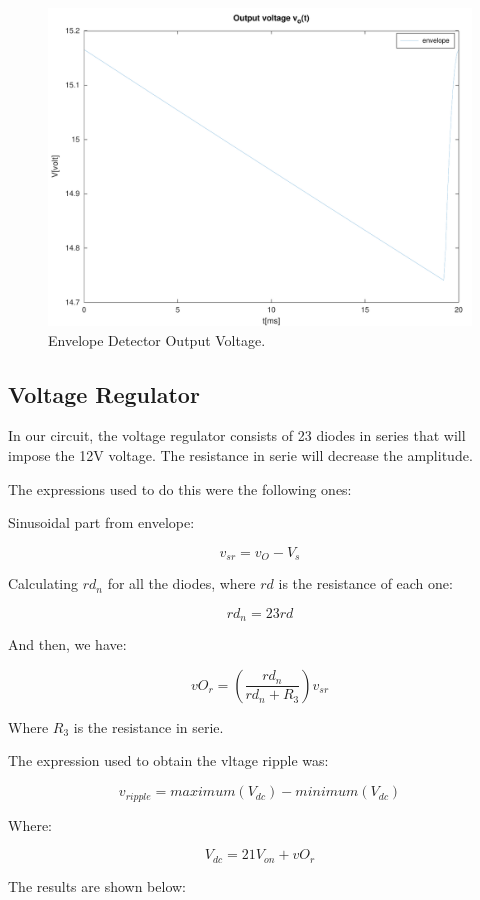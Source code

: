 \begin{figure}[H] \centering
\includegraphics[width=0.7\linewidth]{../mat/envelope.pdf}
\caption{Envelope Detector Output Voltage.}
\label{fig:envelopeth}
\end{figure}

\subsection{Voltage Regulator}
In our circuit, the voltage regulator consists of 23 diodes in series that will impose the 12V voltage. The resistance in serie will decrease the amplitude.\par
The expressions used to do this were the following ones:\par
Sinusoidal part from envelope:\par
\begin{equation}
    v_{sr} = v_O - V_s
\end{equation}\par
Calculating $rd_{n}$ for all the diodes, where $rd$ is the resistance of each one:\par
\begin{equation}
    rd_n = 23rd
\end{equation}\par
And then, we have: \par
\begin{equation}
    vO_r = (\frac{rd_n}{rd_n + R_3})v_{sr}
\end{equation}\par
Where $R_3$ is the resistance in serie.\par
The expression used to obtain the vltage ripple was: \par
\begin{equation}
    v_{ripple} = maximum(V_{dc})-minimum(V_{dc})
\end{equation}\par
Where: \par
\begin{equation}
    V_{dc} = 21V_{on} + vO_r
\end{equation}\par
The results are shown below:\par

